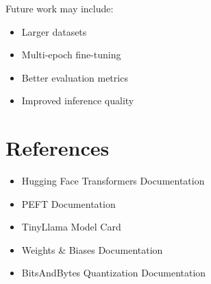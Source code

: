 \documentclass[12pt]{article}
\begin{document}
Future work may include:
\begin{itemize}
    \item Larger datasets
    \item Multi-epoch fine-tuning
    \item Better evaluation metrics
    \item Improved inference quality
\end{itemize}


\section{References}

\begin{itemize}
    \item Hugging Face Transformers Documentation
    \item PEFT Documentation
    \item TinyLlama Model Card
    \item Weights \& Biases Documentation
    \item BitsAndBytes Quantization Documentation
\end{itemize}
\end{document}
